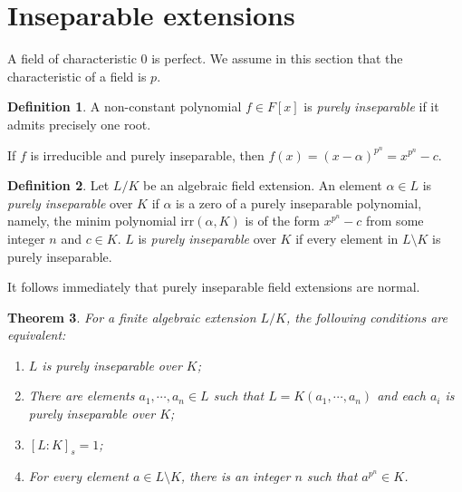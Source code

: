 \documentclass[12pt]{report}
\newtheorem{theorem}{Theorem}[section]
\theoremstyle{definition}
\newtheorem{definition}[theorem]{Definition}
\newcommand{\irr}{\text{irr}}
\begin{document}
\section{Inseparable extensions}

A field of characteristic 0 is perfect. We assume in this section that the characteristic of a field is $p$.

\begin{definition}
	A non-constant polynomial $f\in F[x]$ is \emph{purely inseparable} if it admits precisely one root.
\end{definition}

If $f$ is irreducible and purely inseparable, then $f(x)=(x-\alpha)^{p^n} = x^{p^n}-c$.

\begin{definition}
	Let $L/K$ be an algebraic field extension. An element $\alpha\in L$ is \emph{purely inseparable} over $K$ if $\alpha$ is a zero of a purely inseparable polynomial, namely, the minim polynomial $\irr(\alpha,K)$ is of the form $x^{p^n}-c$ from some integer $n$ and $c\in K$. $L$ is \emph{purely inseparable} over $K$ if every element in $L\setminus K$ is purely inseparable.
\end{definition}

It follows immediately that purely inseparable field extensions are normal.

\begin{theorem}
	For a finite algebraic extension $L/K$, the following conditions are equivalent: \begin{enumerate}
		\item $L$ is purely inseparable over $K$;
		\item There are elements $a_1,\cdots,a_n\in L$ such that $L=K(a_1,\cdots,a_n)$ and each $a_i$ is purely inseparable over $K$;
		\item $[L:K]_s=1$;
		\item For every element $a\in L\setminus K$, there is an integer $n$ such that $a^{p^n}\in K$.
	\end{enumerate}
\end{theorem}
\end{document}
